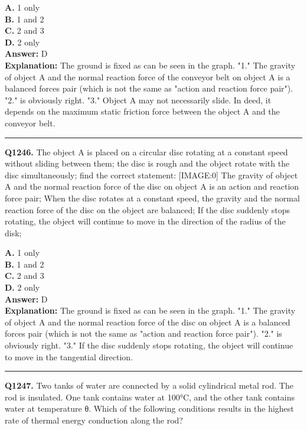 \documentclass[12pt]{article}
\begin{document}
\textbf{A.} 1 only \\
\textbf{B.} 1 and 2 \\
\textbf{C.} 2 and 3 \\
\textbf{D.} 2 only \\

\textbf{Answer:} D \\
\textbf{Explanation:} The ground is fixed as can be seen in the graph. "1." The gravity of object A and the normal reaction force of the conveyor belt on object A is a balanced forces pair (which is not the same as "action and reaction force pair"). "2." is obviously right. "3." Object A may not necessarily slide. In deed, it depends on the maximum static friction force between the object A and the conveyor belt.

\hrule
\vspace{1em}


\noindent
\textbf{Q1246.} The object A is placed on a circular disc rotating at a constant speed without sliding between them; the disc is rough and the object rotate with the disc simultaneously; find the correct statement:
[IMAGE:0]
The gravity of object A and the normal reaction force of the disc on object A is an action and reaction force pair;
When the disc rotates at a constant speed, the gravity and the normal reaction force of the disc on the object are balanced;
If the disc suddenly stops rotating, the object will continue to move in the direction of the radius of the disk;



\textbf{A.} 1 only \\
\textbf{B.} 1 and 2 \\
\textbf{C.} 2 and 3 \\
\textbf{D.} 2 only \\

\textbf{Answer:} D \\
\textbf{Explanation:} The ground is fixed as can be seen in the graph. "1." The gravity of object A and the normal reaction force of the disc on object A is a balanced forces pair (which is not the same as "action and reaction force pair"). "2." is obviously right. "3." If the disc suddenly stops rotating, the object will continue to move in the tangential direction.

\hrule
\vspace{1em}


\noindent
\textbf{Q1247.} Two tanks of water are connected by a solid cylindrical metal rod. The rod is insulated. One tank contains water at 100°C, and the other tank contains water at temperature θ.
Which of the following conditions results in the highest rate of thermal energy conduction along the rod?
\end{document}
